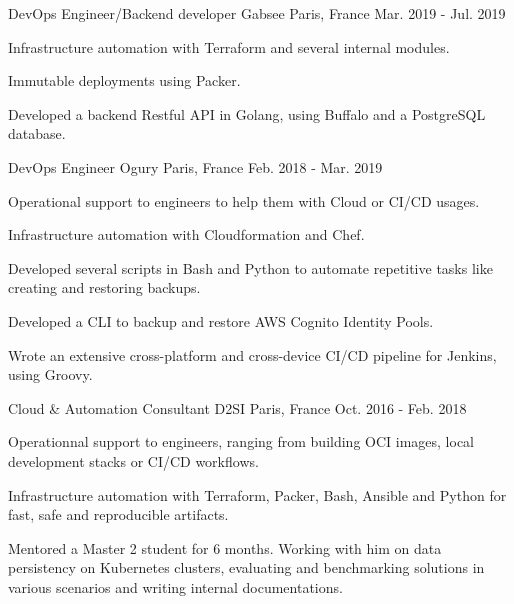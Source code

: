 \begin{cventries}
  \cventry
    {DevOps Engineer/Backend developer} %
    {Gabsee} %
    {Paris, France} %
    {Mar. 2019 - Jul. 2019} %
    {
      \begin{cvitems} %
        \item {Infrastructure automation with Terraform and several internal modules.}
        \item {Immutable deployments using Packer.}
        \item {Developed a backend Restful API in Golang, using Buffalo and a PostgreSQL database.}
      \end{cvitems}
    }

  \cventry
    {DevOps Engineer} %
    {Ogury} %
    {Paris, France} %
    {Feb. 2018 - Mar. 2019} %
    {
      \begin{cvitems} %
        \item {Operational support to engineers to help them with Cloud or CI/CD usages.}
        \item {Infrastructure automation with Cloudformation and Chef.}
        \item {Developed several scripts in Bash and Python to automate repetitive tasks like creating and restoring backups.}
        \item {Developed a CLI to backup and restore AWS Cognito Identity Pools.}
        \item {Wrote an extensive cross-platform and cross-device CI/CD pipeline for Jenkins, using Groovy.}
      \end{cvitems}
    }

  \cventry
    {Cloud \& Automation Consultant} %
    {D2SI} %
    {Paris, France} %
    {Oct. 2016 - Feb. 2018} %
    {
      \begin{cvitems} %
        \item {Operationnal support to engineers, ranging from building OCI images, local development stacks or CI/CD workflows.}
        \item {Infrastructure automation with Terraform, Packer, Bash, Ansible and Python for fast, safe and reproducible artifacts.}
        \item {Mentored a Master 2 student for 6 months. Working with him on data persistency on Kubernetes clusters, evaluating and benchmarking solutions in various scenarios and writing internal documentations.}
      \end{cvitems}
    }


\end{cventries}
